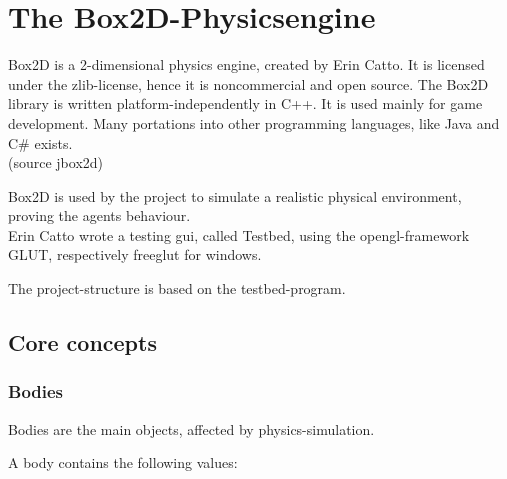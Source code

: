 \documentclass[10pt,a4paper,DIV=11]{scrreprt}
\begin{document}
\chapter{The Box2D-Physicsengine}
Box2D is a 2-dimensional physics engine, created by Erin Catto. It is licensed under the zlib-license, hence it is noncommercial and open source. The Box2D library is written platform-independently in C++. It is used mainly for game development. Many portations into other programming languages, like Java and C\# exists. \\
(source jbox2d)


Box2D is used by the project to simulate a realistic physical environment, proving the agents behaviour. \\

Erin Catto wrote a testing gui, called Testbed, using the opengl-framework GLUT, respectively freeglut for windows.

The project-structure is based on the testbed-program.


\section{Core concepts}

\subsection{Bodies}
Bodies are the main objects, affected by physics-simulation.

A body contains the following values: \\

   \\
\\
\end{document}
